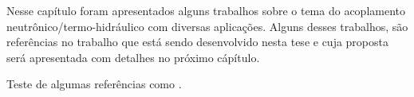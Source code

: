 Nesse capítulo foram apresentados alguns trabalhos sobre o tema do acoplamento neutrônico/termo-hidráulico 
com diversas aplicações. Alguns desses trabalhos, são referências no trabalho que está sendo desenvolvido 
nesta tese e cuja proposta será apresentada com detalhes no próximo cápítulo.

Teste de algumas referências como \cite{Fiorina2015}.
